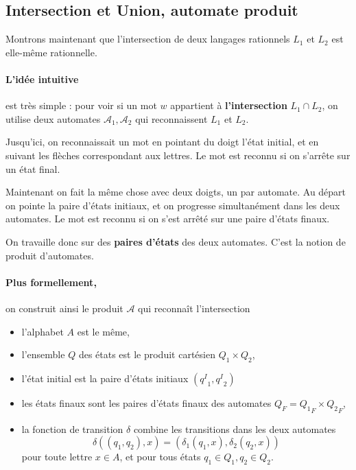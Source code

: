 \documentclass[10pt,twoside]{article}
\begin{document}
\subsection{Intersection et Union, automate produit}

\label{union}

Montrons maintenant que l'intersection de deux langages rationnels 
 $L_1$ et $L_2$ est elle-même rationnelle.

\paragraph{L'idée intuitive} est très simple : pour voir si un mot $w$ appartient 
à \textbf{l'intersection} $L_1 \cap L_2$,
on utilise deux automates $\mathcal{A}_1, \mathcal{A}_2$ qui reconnaissent
$L_1$ et $L_2$.

Jusqu'ici, on reconnaissait un mot en pointant du doigt l'état initial, et en suivant les flèches correspondant aux lettres. Le mot est reconnu si on s'arrête sur
un état final.

Maintenant on fait la même chose avec deux doigts, un par automate. Au départ on 
pointe la paire d'états initiaux, et on progresse simultanément dans les deux automates. Le mot est reconnu si on s'est arrêté sur une paire d'états finaux.

On travaille donc sur des \textbf{paires d'états} des deux
automates. C'est la notion de produit d'automates.

\paragraph{Plus formellement,} on construit ainsi le produit  $\mathcal{A}$ qui reconnaît l'intersection
\begin{itemize}
\item l'alphabet $A$ est le même,
\item l'ensemble $Q$ des états est le produit cartésien $Q_1 \times  Q_2$,
\item l'état initial est la paire  d'états initiaux $({q^I}_1, {q^I}_2)$
\item les états finaux sont les paires d'états finaux des automates $Q_F = {Q_1}_F \times  {Q_2}_F$,
\item la fonction de transition $\delta$ combine les transitions dans les deux automates
$$ \delta( (q_1, q_2) , x ) = ( \delta_1(q_1, x), \delta_2(q_2, x)) $$
pour toute lettre $x \in A$, et pour tous états $q_1 \in Q_1,  q_2 \in Q_2$. 
\end{itemize}
\end{document}
